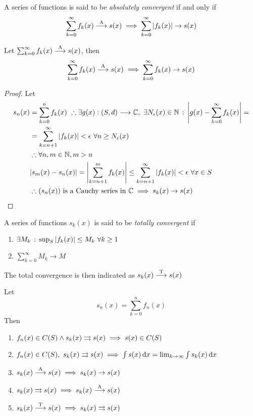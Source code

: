 \documentclass[../complete.tex]{subfiles}
\begin{document}
\begin{dfn}
	A series of functions is said to be \textit{absolutely convergent} if and only if
	\begin{equation}
		\sum_{k=0}^\infty f_k(x)\overset{\mathrm{A}}{\longrightarrow} s(x)\implies\sum_{k=0}^\infty\abs{f_k(x)}\to s(x)
		\label{eq:absoluteconvser}
	\end{equation}
\end{dfn}
\begin{thm}
	Let $\sum_{k=0}^\infty f_k(x)\overset{\mathrm{A}}{\longrightarrow} s(x)$, then
	\begin{equation}
		\sum_{k=0}^\infty f_k(x)\overset{\mathrm{A}}{\longrightarrow} s(x)\implies\sum_{k=0}^\infty f_k(x)\to s(x)
		\label{eq:abstounif}
	\end{equation}
\end{thm}
\begin{proof}
	Let
	\begin{equation*}
		\begin{aligned}
			s_n(x)&=\sum_{k=0}^nf_k(x)\ \therefore\exists g(x):(S,d)\fto\Cf,\ \exists N_\epsilon(x)\in\N\st\abs{g(x)-\sum_{k=0}^\infty f_k(x)}=\\
			&=\sum_{k=n+1}^{\infty}\abs{f_k(x)}<\epsilon\ \forall n\ge N_\epsilon(x)\\
			&\therefore\forall n,m\in\N, m>n\\
			&\abs{s_m(x)-s_n(x)}=\abs{\sum_{k=n+1}^mf_k(x)}\le\sum_{k=n+1}^{\infty}\abs{f_k(x)}<\epsilon\ \forall x\in S\\
			&\therefore(s_n(x))\text{ is a Cauchy series in }\Cf\implies s_k(x)\to s(x)
		\end{aligned}
	\end{equation*}
\end{proof}
\begin{dfn}
	A series of functions $s_k(x)$ is said to be \textit{totally convergent} if
	\begin{enumerate}
	\item $\exists M_k\, :\, \sup_{S}\abs{f_k(x)}\le M_k\ \forall k\ge 1$
	\item $\sum_{k=0}^\infty M_k\to M$
	\end{enumerate}
	The total convergence is then indicated as $s_k(x)\overset{\mathrm{T}}{\longrightarrow} s(x)$
\end{dfn}
\begin{prop}
	Let
	\begin{equation*}
		s_n(x)=\sum_{k=0}^{n}f_n(x)
	\end{equation*}
	Then
	\begin{enumerate}
	\item $f_n(x)\in C(S)\wedge s_k(x)\rightrightarrows s(x)\implies s(x)\in C(S)$
	\item $f_n(x)\in C(S),\ s_k(x)\rightrightarrows s(x)\implies\int s(x)\operatorname{d\!} x=\lim_{k\to\infty}\int s_k(x)\operatorname{d\!} x$
	\item $s_k(x)\overset{\mathrm{A}}{\longrightarrow} s(x)\implies s_k(x)\to s(x)$
	\item $s_k(x)\rightrightarrows s(x)\implies s_k(x)\overset{\mathrm{A}}{\longrightarrow} s(x)$
	\item $s_k(x)\overset{\mathrm{T}}{\longrightarrow} s(x)\implies s_k(x)\rightrightarrows s(x)$
	\end{enumerate}
\end{prop}
\end{document}
